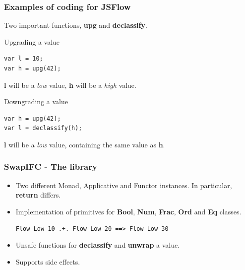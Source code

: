 \documentclass{beamer}
\begin{document}

\begin{frame}[fragile]
  \frametitle{Examples of coding for JSFlow}
  Two important functions, \textbf{upg} and \textbf{declassify}.
  \pause
  \begin{block}{Upgrading a value}
\begin{verbatim}
var l = 10;
var h = upg(42);
\end{verbatim}
  \end{block}
  \textbf{l} will be a \emph{low} value, \textbf{h} will be a \emph{high} value.
  \pause
  \begin{block}{Downgrading a value}
\begin{verbatim}
var h = upg(42);
var l = declassify(h);
\end{verbatim}
  \end{block}
  \textbf{l} will be a \emph{low} value, containing the same value as \textbf{h}.
\end{frame}


\begin{frame}[fragile]
  \frametitle{SwapIFC - The library}
  \begin{itemize}
    \item Two different Monad, Applicative and Functor instances. In particular, \textbf{return} differs. \pause
    \item Implementation of primitives for \textbf{Bool}, \textbf{Num}, \textbf{Frac}, \textbf{Ord} and \textbf{Eq} classes. \pause
\begin{verbatim}
Flow Low 10 .+. Flow Low 20 ==> Flow Low 30
\end{verbatim}
\pause
    \item Unsafe functions for \textbf{declassify} and \textbf{unwrap} a value. \pause
    \item Supports side effects.
  \end{itemize}
\end{frame}

\end{document}

